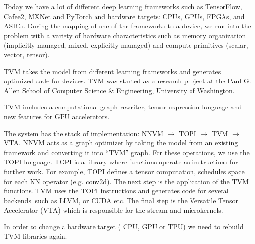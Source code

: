 \documentclass[titlepage]{report}
\begin{document}
Today we have a lot of different deep learning frameworks such as TensorFlow, Cafee2, MXNet and PyTorch and hardware targets: CPUs, GPUs, FPGAs, and ASICs. During the mapping of one of the frameworks to a device, we run into the problem with a variety of hardware characteristics such as memory organization (implicitly managed, mixed, explicitly managed) and compute primitives (scalar, vector, tensor).

TVM takes the model from different learning frameworks and generates optimized code for devices. TVM was started as a research project at the Paul G. Allen School of Computer Science & Engineering, University of Washington.

TVM includes a computational graph rewriter, tensor expression language and new features for GPU accelerators.

The system has the stack of implementation: NNVM $\to$ TOPI $\to$ TVM $\to$ VTA. NNVM acts as a graph optimizer by taking the model from an existing framework  and converting it into “TVM” graph. For these operations, we use the TOPI language. TOPI is a library where functions operate as instructions for further work. For example, TOPI defines a tensor computation, schedules space for each NN operator (e.g. conv2d). The next step is the application of the TVM functions. TVM uses the TOPI instructions and generates code for several backends, such as LLVM, or CUDA etc. The final step is the Versatile Tensor Accelerator (VTA) which is responsible for the stream and microkernels. 

In order to change a hardware target ( CPU, GPU or TPU) we need to rebuild TVM libraries again.  
\end{document}
